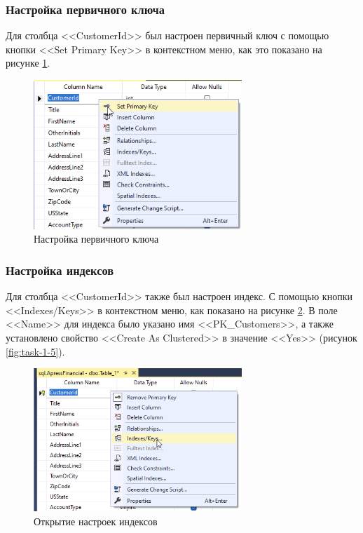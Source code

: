 \documentclass[a4paper, 14pt]{extarticle}
\begin{document}
\subsubsection{Настройка первичного ключа}

Для столбца <<CustomerId>> был настроен первичный ключ с помощью кнопки <<Set
Primary Key>> в контекстном меню, как это показано на рисунке
\ref{fig:task-1-3}.

\begin{figure}[H]
  \centering
  \includegraphics[width=0.7\textwidth]{images/task-1/3.png}
  \caption{Настройка первичного ключа}
  \label{fig:task-1-3}
\end{figure}

\subsubsection{Настройка индексов}

Для столбца <<CustomerId>> также был настроен индекс. С помощью кнопки
<<Indexes/Keys>> в контекстном меню, как показано на рисунке \ref{fig:task-1-4}.
В поле <<Name>> для индекса было указано имя <<PK\_Customers>>, а также
установлено свойство <<Create As Clustered>> в значение <<Yes>> (рисунок
\ref{fig:task-1-5}).

\begin{figure}[H]
  \centering
  \includegraphics[width=0.7\textwidth]{images/task-1/4.png}
  \caption{Открытие настроек индексов}
  \label{fig:task-1-4}
\end{figure}
\end{document}
